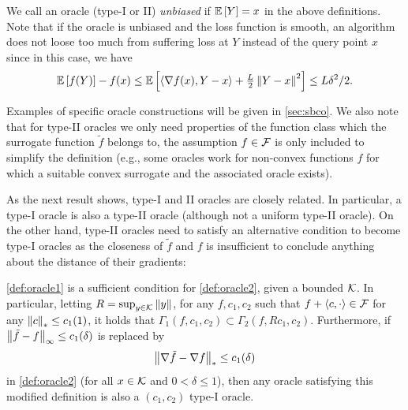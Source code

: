 We call an oracle (type-I or II)  \emph{unbiased} if $\mathbb{E}\left[Y\right]=x$ in the above definitions. Note that if the oracle is unbiased and the loss function is smooth,
 an algorithm does not loose too much from suffering loss at $Y$ instead of the query point $x$
 since in this case, we have 
$$\mathbb{E}\left[f(Y)\right]-f(x) \le \mathbb{E}\left[\langle \nabla f(x), Y-x \rangle+\tfrac{L}{2}\left\|Y-x\right\|^2\right] \le L\delta^2/2.$$

Examples of specific oracle constructions will be given in  \cref{sec:sbco}. We also note that for type-II oracles we only need properties of the function class which the surrogate function $\tilde{f}$ belongs to, the assumption $f \in \mathcal{F}$ is only included to simplify the definition (e.g., some oracles work for non-convex functions $f$ for which a suitable convex surrogate and the associated oracle exists).

As the next result shows, type-I and II oracles are closely related.
In particular, a type-I oracle is also a type-II oracle (although not a uniform type-II oracle). On the other hand, type-II oracles need to satisfy an alternative condition to become type-I oracles as the closeness of $\tilde{f}$ and $f$ is insufficient to conclude anything about the distance of their gradients:
\begin{proposition}\label{thm:typered}
\cref{def:oracle1} is a sufficient condition for \cref{def:oracle2}, given a bounded $\mathcal{K}$. 
In particular, letting $R = \sup_{y \in \mathcal{K}}\left\|y\right\|$, 
for any $f,c_1,c_2$ such that $f+\langle c,\cdot \rangle \in \mathcal{F}$ for any $\left\|c\right\|_* \le c_1(1)$, it holds that $\Gamma_1(f,c_1,c_2) \subset \Gamma_2(f,Rc_1,c_2)$. 
Furthermore, if $\big\|\tilde{f}-f\big\|_\infty \le c_1(\delta)$ is replaced by 
\begin{align}
\label{eq:oracle2alt}
\big\|\nabla \tilde{f}- \nabla f\big\|_* \le c_1(\delta)
\end{align}
in \cref{def:oracle2} (for all $x\in\mathcal{K}$ and $0<\delta \le 1$), then any oracle satisfying this modified definition  is also a $(c_1,c_2)$ type-I oracle.
\end{proposition}

